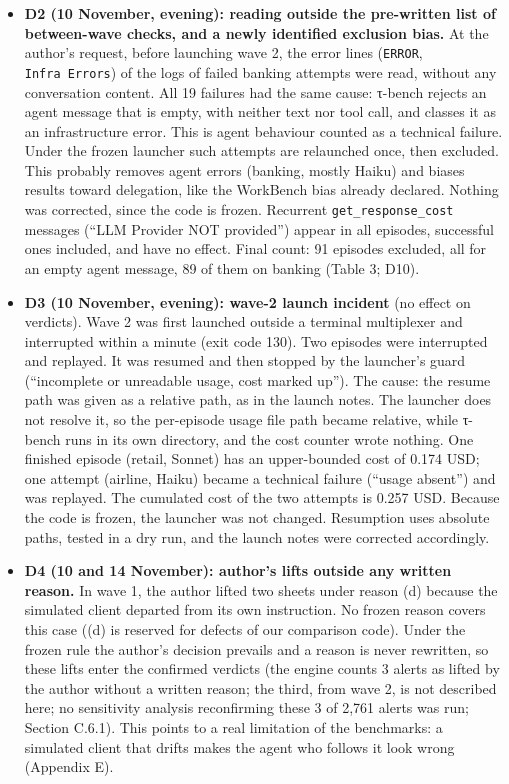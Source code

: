 \begin{itemize}
\item
  \textbf{D2 (10 November, evening): reading outside the pre-written list of between-wave checks, and a newly identified exclusion bias.} At the author's request, before launching wave 2, the error lines (\texttt{ERROR}, \texttt{Infra\ Errors}) of the logs of failed banking attempts were read, without any conversation content. All 19 failures had the same cause: τ-bench rejects an agent message that is empty, with neither text nor tool call, and classes it as an infrastructure error. This is agent behaviour counted as a technical failure. Under the frozen launcher such attempts are relaunched once, then excluded. This probably removes agent errors (banking, mostly Haiku) and biases results toward delegation, like the WorkBench bias already declared. Nothing was corrected, since the code is frozen. Recurrent \texttt{get\_\allowbreak{}response\_\allowbreak{}cost} messages (``LLM Provider NOT provided'') appear in all episodes, successful ones included, and have no effect. Final count: 91 episodes excluded, all for an empty agent message, 89 of them on banking (Table 3; D10).
\item
  \textbf{D3 (10 November, evening): wave-2 launch incident} (no effect on verdicts). Wave 2 was first launched outside a terminal multiplexer and interrupted within a minute (exit code 130). Two episodes were interrupted and replayed. It was resumed and then stopped by the launcher's guard (``incomplete or unreadable usage, cost marked up''). The cause: the resume path was given as a relative path, as in the launch notes. The launcher does not resolve it, so the per-episode usage file path became relative, while τ-bench runs in its own directory, and the cost counter wrote nothing. One finished episode (retail, Sonnet) has an upper-bounded cost of 0.174 USD; one attempt (airline, Haiku) became a technical failure (``usage absent'') and was replayed. The cumulated cost of the two attempts is 0.257 USD. Because the code is frozen, the launcher was not changed. Resumption uses absolute paths, tested in a dry run, and the launch notes were corrected accordingly.
\item
  \textbf{D4 (10 and 14 November): author's lifts outside any written reason.} In wave 1, the author lifted two sheets under reason (d) because the simulated client departed from its own instruction. No frozen reason covers this case ((d) is reserved for defects of our comparison code). Under the frozen rule the author's decision prevails and a reason is never rewritten, so these lifts enter the confirmed verdicts (the engine counts 3 alerts as lifted by the author without a written reason; the third, from wave 2, is not described here; no sensitivity analysis reconfirming these 3 of 2,761 alerts was run; Section C.6.1). This points to a real limitation of the benchmarks: a simulated client that drifts makes the agent who follows it look wrong (Appendix E).

\end{itemize}
